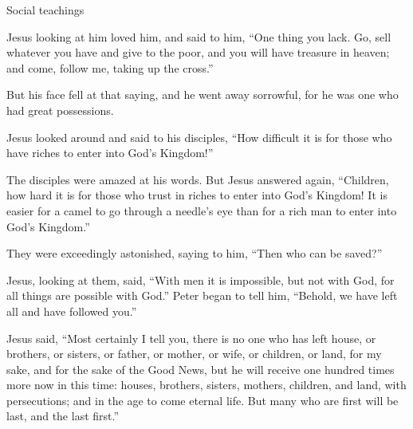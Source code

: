 \documentclass[10pt,twoside]{article} %
\begin{document}
\begin{section}{Social teachings}
{  Jesus looking at him loved him, and said to him, ``One thing you lack. Go, sell whatever you have and give to the poor, and you will have treasure in heaven; and come, follow me, taking up the cross.''

  But his face fell at that saying, and he went away sorrowful, for he was one who had great possessions.

  Jesus looked around and said to his disciples, ``How difficult it is for those who have riches to enter into God's Kingdom!''

  The disciples were amazed at his words. But Jesus answered again, ``Children, how hard it is for those who trust in riches to enter into God's Kingdom!    It is easier for a camel to go through a needle's eye than for a rich man to enter into God's Kingdom.''

  They were exceedingly astonished, saying to him, ``Then who can be saved?''

  Jesus, looking at them, said, ``With men it is impossible, but not with God, for all things are possible with God.'' 
 Peter began to tell him, ``Behold, we have left all and have followed you.''

  Jesus said, ``Most certainly I tell you, there is no one who has left house, or brothers, or sisters, or father, or mother, or wife, or children, or land, for my sake, and for the sake of the Good News,    but he will receive one hundred times more now in this time: houses, brothers, sisters, mothers, children, and land, with persecutions; and in the age to come eternal life.    But many who are first will be last, and the last first.'' }

\end{section}
\end{document}
